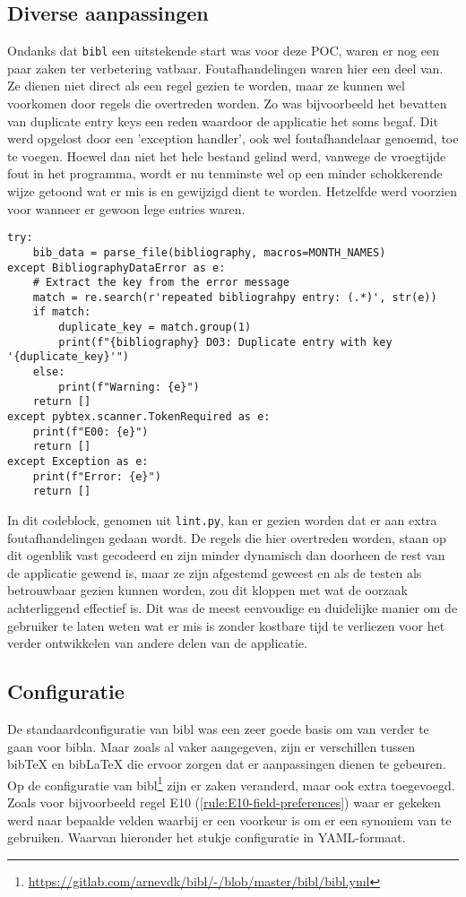 \subsection{Diverse aanpassingen}
Ondanks dat \texttt{bibl} een uitstekende start was voor deze \acrlong{POC}, waren er nog een paar zaken ter verbetering vatbaar. Foutafhandelingen waren hier een deel van. Ze dienen niet direct als een regel gezien te worden, maar ze kunnen wel voorkomen door regels die overtreden worden. Zo was bijvoorbeeld het bevatten van duplicate entry keys een reden waardoor de applicatie het soms begaf. Dit werd opgelost door een 'exception handler', ook wel foutafhandelaar genoemd, toe te voegen. Hoewel dan niet het hele bestand gelind werd, vanwege de vroegtijde fout in het programma, wordt er nu tenminste wel op een minder schokkerende wijze getoond wat er mis is en gewijzigd dient te worden. Hetzelfde werd voorzien voor wanneer er gewoon lege entries waren.  

\begin{verbatim}
try:
    bib_data = parse_file(bibliography, macros=MONTH_NAMES)
except BibliographyDataError as e:
    # Extract the key from the error message
    match = re.search(r'repeated bibliograhpy entry: (.*)', str(e))
    if match:
        duplicate_key = match.group(1)
        print(f"{bibliography} D03: Duplicate entry with key '{duplicate_key}'")
    else:
        print(f"Warning: {e}")
    return []
except pybtex.scanner.TokenRequired as e:
    print(f"E00: {e}")
    return []
except Exception as e:
    print(f"Error: {e}")
    return []
\end{verbatim}

In dit codeblock, genomen uit \texttt{lint.py}, kan er gezien worden dat er aan extra foutafhandelingen gedaan wordt. De regels die hier overtreden worden, staan op dit ogenblik vast gecodeerd en zijn minder dynamisch dan doorheen de rest van de applicatie gewend is, maar ze zijn afgestemd geweest en als de testen als betrouwbaar gezien kunnen worden, zou dit kloppen met wat de oorzaak achterliggend effectief is. Dit was de meest eenvoudige en duidelijke manier om de gebruiker te laten weten wat er mis is zonder kostbare tijd te verliezen voor het verder ontwikkelen van andere delen van de applicatie.

\subsection{Configuratie}
De standaardconfiguratie van bibl was een zeer goede basis om van verder te gaan voor bibla. Maar zoals al vaker aangegeven, zijn er verschillen tussen bibTeX en bibLaTeX die ervoor zorgen dat er aanpassingen dienen te gebeuren. Op de configuratie van bibl\footnote{\url{https://gitlab.com/arnevdk/bibl/-/blob/master/bibl/bibl.yml}} zijn er zaken veranderd, maar ook extra toegevoegd. Zoals voor bijvoorbeeld regel E10 (\ref{rule:E10-field-preferences}) waar er gekeken werd naar bepaalde velden waarbij er een voorkeur is om er een synoniem van te gebruiken. Waarvan hieronder het stukje configuratie in YAML-formaat.

